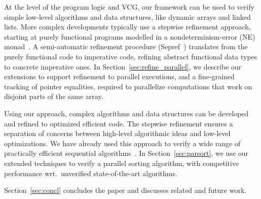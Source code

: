 \documentclass[sn-mathphys,Numbered]{sn-jnl}
\theoremstyle{thmstyleone}%
\theoremstyle{definition}%
\theoremstyle{thmstylethree}%
\begin{document}
At the level of the program logic and VCG, our framework can be used to verify simple low-level algorithms and data structures,
like dynamic arrays and linked lists. More complex developments typically use a stepwise refinement approach,
starting at purely functional programs modelled in a nondeterminism-error (NE) monad~\cite{LaTu12}.
A semi-automatic refinement procedure (Sepref~\cite{La15,La19-llvm}) translates from the purely functional
code to imperative code, refining abstract functional data types to concrete imperative ones.
In Section~\ref{sec:refine_parallel}, we describe our extensions to support refinement to parallel executions,
and a fine-grained tracking of pointer equalities, required to parallelize computations that work on
disjoint parts of the same array.

Using our approach, complex algorithms and data structures can be developed and
refined to optimized efficient code. The stepwise refinement ensures a separation of concerns
between high-level algorithmic ideas and low-level optimizations. We have already used this approach to
verify a wide range of practically efficient sequential algorithms~\cite{ELNN13,BrLa18,WiLa18,La17_CADE,La17_SAT,FBL18,La14,LaSe16,LaSe19,La20}.
In Section~\ref{sec:parsort}, we use our extended techniques to verify a parallel sorting algorithm,
with competitive performance wrt.\ unverified state-of-the-art algorithms.

Section~\ref{sec:concl} concludes the paper and discusses related and future work.
\end{document}
